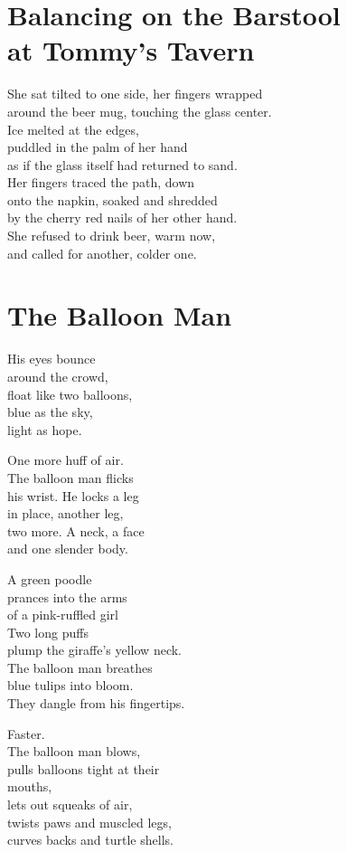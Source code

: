 \documentclass[twoside,10pt]{book}
\begin{document}
\clearpage
\section{Balancing on the Barstool\\ at Tommy's Tavern}

She sat tilted to one side, her fingers wrapped\\
around the beer mug, touching the glass center.\\
Ice melted at the edges,\\
puddled in the palm of her hand\\
as if the glass itself had returned to sand.\\
Her fingers traced the path, down\\
onto the napkin, soaked and shredded\\
by the cherry red nails of her other hand.\\
She refused to drink beer, warm now,\\
and called for another, colder one.

\clearpage
\section{The Balloon Man}

His eyes bounce\\
around the crowd,\\
float like two balloons,\\
blue as the sky,\\
light as hope.

One more huff of air.\\
The balloon man flicks\\
his wrist. He locks a leg\\
in place, another leg,\\
two more. A neck, a face\\
and one slender body.

A green poodle\\
prances into the arms\\
of a pink-ruffled girl\\
Two long puffs\\
plump the giraffe's yellow neck.\\
The balloon man breathes\\
blue tulips into bloom.\\
They dangle from his fingertips.

Faster.\\
The balloon man blows,\\
pulls balloons tight at their\\
mouths,\\
lets out squeaks of air,\\
twists paws and muscled legs,\\
curves backs and turtle shells.
\end{document}

